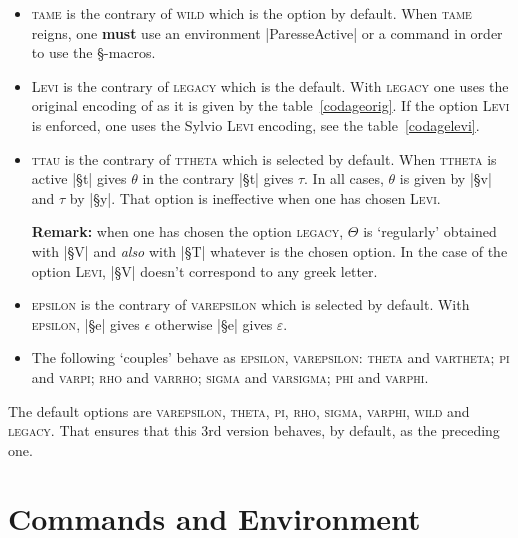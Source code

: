 \documentclass[full, english]{l3doc}
\newcommand\Option[1]{\textsc{#1}}
\begin{document}
\begin{itemize}
\item \Option{tame}  is the contrary of
  \Option{wild} which is the option by default. When \Option{tame}
  reigns, one \textbf{must} use an environment |ParesseActive| or a
  command  in order to use the §-macros.

\item \Option{Levi}  is the
  contrary of \Option{legacy} which is the default. With
  \Option{legacy} one uses the original encoding of
   as it is given by the
  table~\ref{codageorig}. If the option \Option{Levi} is enforced, one
  uses the Sylvio \textsc{Levi} encoding, see the
  table~\ref{codagelevi}.

\item \Option{ttau}  is the contrary of
  \Option{ttheta} which is selected by default. When \Option{ttheta}
  is active |§t| gives \(\theta\) in the contrary |§t| gives
  \(\tau\). In all cases, \(\theta\) is given by |§v| and \(\tau\) by
  |§y|.  That option is ineffective when one has chosen
  \Option{Levi}.

\textbf{Remark:}  when one has chosen the option
\Option{legacy}, \(\Theta\) is `regularly' obtained with |§V| and
\emph{also} with |§T| whatever is the chosen option. In the case of
the option \Option{Levi}, |§V| doesn't correspond to any greek letter.

\item \Option{epsilon}  is the
  contrary of \Option{varepsilon} which is selected by default. With
  \Option{epsilon}, |§e| gives \(\epsilon\) otherwise |§e| gives
  \(\varepsilon\).

\item The following `couples' behave as \Option{epsilon},
  \Option{varepsilon}: \Option{theta} and \Option{vartheta};
  \Option{pi} and \Option{varpi}; \Option{rho} and \Option{varrho};
  \Option{sigma} and \Option{varsigma}; \Option{phi} and
  \Option{varphi}.
\end{itemize}

The default options are \Option{varepsilon}, \Option{theta},
\Option{pi}, \Option{rho}, \Option{sigma}, \Option{varphi},
\Option{wild} and \Option{legacy}. That ensures that this 3rd
version behaves, by default, as the preceding one.

\section{Commands and Environment}
\end{document}
